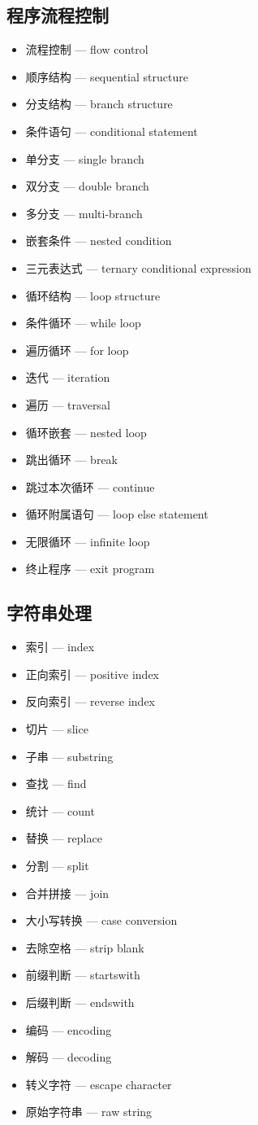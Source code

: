 \subsection{程序流程控制}
\begin{itemize}
\item 流程控制 — flow control
\item 顺序结构 — sequential structure
\item 分支结构 — branch structure
\item 条件语句 — conditional statement
\item 单分支 — single branch
\item 双分支 — double branch
\item 多分支 — multi-branch
\item 嵌套条件 — nested condition
\item 三元表达式 — ternary conditional expression
\item 循环结构 — loop structure
\item 条件循环 — while loop
\item 遍历循环 — for loop
\item 迭代 — iteration
\item 遍历 — traversal
\item 循环嵌套 — nested loop
\item 跳出循环 — break
\item 跳过本次循环 — continue
\item 循环附属语句 — loop else statement
\item 无限循环 — infinite loop
\item 终止程序 — exit program
\end{itemize}

\subsection{字符串处理}
\begin{itemize}
\item 索引 — index
\item 正向索引 — positive index
\item 反向索引 — reverse index
\item 切片 — slice
\item 子串 — substring
\item 查找 — find
\item 统计 — count
\item 替换 — replace
\item 分割 — split
\item 合并拼接 — join
\item 大小写转换 — case conversion
\item 去除空格 — strip blank
\item 前缀判断 — startswith
\item 后缀判断 — endswith
\item 编码 — encoding
\item 解码 — decoding
\item 转义字符 — escape character
\item 原始字符串 — raw string
\end{itemize}

